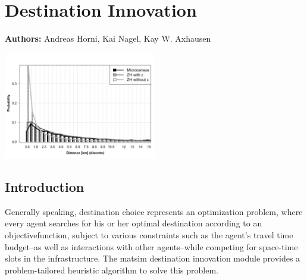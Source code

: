 \chapter{Destination Innovation}
\label{ch:destinationchoice}
\hfill \textbf{Authors:} Andreas Horni, Kai Nagel, Kay W. Axhausen

\begin{center} \includegraphics[width=0.5\textwidth, angle=0]{extending/figures/dc/zhLeisure.pdf} \end{center}


\section{Introduction}
%
Generally speaking, destination choice represents an optimization problem, where every agent searches for his or her optimal destination according to an \gls{objectivefunction}, subject to various constraints such as the agent's travel time budget--as well as interactions with other agents--while competing for space-time slots in the infrastructure. The \gls{matsim} destination innovation module provides a problem-tailored heuristic algorithm to solve this problem.

